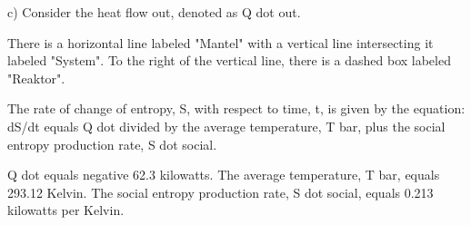 c) Consider the heat flow out, denoted as Q dot out.

There is a horizontal line labeled "Mantel" with a vertical line intersecting it labeled "System". To the right of the vertical line, there is a dashed box labeled "Reaktor".

The rate of change of entropy, S, with respect to time, t, is given by the equation:
dS/dt equals Q dot divided by the average temperature, T bar, plus the social entropy production rate, S dot social.

Q dot equals negative 62.3 kilowatts.
The average temperature, T bar, equals 293.12 Kelvin.
The social entropy production rate, S dot social, equals 0.213 kilowatts per Kelvin.